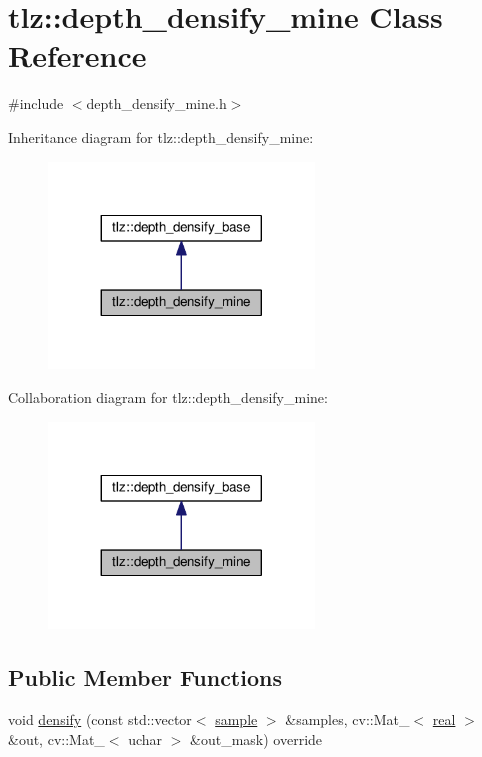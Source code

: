 \hypertarget{classtlz_1_1depth__densify__mine}{}\section{tlz\+:\+:depth\+\_\+densify\+\_\+mine Class Reference}
\label{classtlz_1_1depth__densify__mine}


{\ttfamily \#include $<$depth\+\_\+densify\+\_\+mine.\+h$>$}



Inheritance diagram for tlz\+:\+:depth\+\_\+densify\+\_\+mine\+:
\nopagebreak
\begin{figure}[H]
\begin{center}
\leavevmode
\includegraphics[width=200pt]{classtlz_1_1depth__densify__mine__inherit__graph}
\end{center}
\end{figure}


Collaboration diagram for tlz\+:\+:depth\+\_\+densify\+\_\+mine\+:
\nopagebreak
\begin{figure}[H]
\begin{center}
\leavevmode
\includegraphics[width=200pt]{classtlz_1_1depth__densify__mine__coll__graph}
\end{center}
\end{figure}
\subsection*{Public Member Functions}
\begin{DoxyCompactItemize}
\item 
void \hyperlink{classtlz_1_1depth__densify__mine_a71e64d0d4db6cd8f8f0d10d7fcbc9292}{densify} (const std\+::vector$<$ \hyperlink{classtlz_1_1depth__densify__base_a79b5945bdb65c2e1d988bf07ad730a09}{sample} $>$ \&samples, cv\+::\+Mat\+\_\+$<$ \hyperlink{namespacetlz_a15fd37cce97f2b8b606af18c2615f602}{real} $>$ \&out, cv\+::\+Mat\+\_\+$<$ uchar $>$ \&out\+\_\+mask) override
\end{DoxyCompactItemize}
